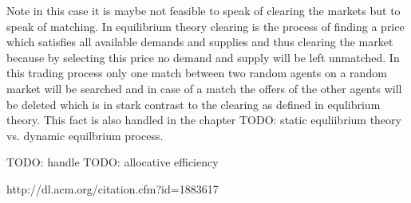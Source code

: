 \documentclass[../Bachelorarbeit.tex]{subfiles}
\begin{document}
Note in this case it is maybe not feasible to speak of clearing the markets but to speak of matching. In equilibrium theory clearing is the process of finding a price which satisfies all available demands and supplies and thus clearing the market because by selecting this price no demand and supply will be left unmatched. In this trading process only one match between two random agents on a random market will be searched and in case of a match the offers of the other agents will be deleted which is in stark contrast to the clearing as defined in equlibrium theory. This fact is also handled in the chapter TODO: static equliibrium theory vs. dynamic equilbrium process.

\medskip

TODO: handle \cite{GodeSunder1993}
TODO: allocative efficiency

\medskip

http://dl.acm.org/citation.cfm?id=1883617
\end{document}
